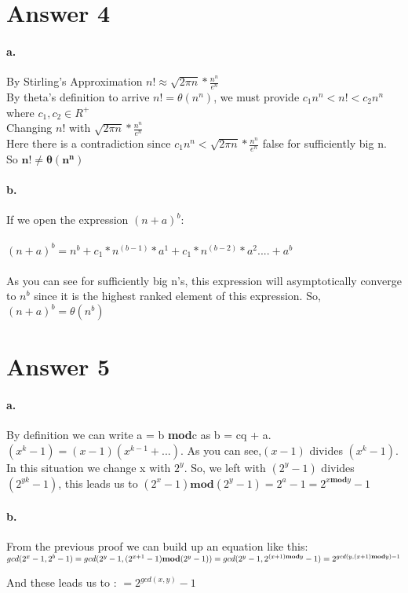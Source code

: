 \documentclass[11pt]{article}
\begin{document}
\newpage
\section*{Answer 4}
\paragraph{a.}
By Stirling's Approximation $n! \approx \sqrt{2\pi n} * \frac{n^n}{e^n}$ \\
By theta's definition to arrive $n! = \theta(n^n)$, we must provide $c_1n^n< n!<c_2n^n $ where $c_1,c_2 \in R^+$ \\
Changing $n!$ with $\sqrt{2\pi n} * \frac{n^n}{e^n}$ \\
Here there is a contradiction since $c_1n^n <\sqrt{2\pi n} * \frac{n^n}{e^n} $ false for sufficiently big n.\\
So $\mathbf{n! \neq \theta(n^n)} $

\paragraph{b.}
If we open the expression $(n+a)^b$:\\\\
$(n + a)^b = n^b + c_1 * n^(b-1)*a^1 + c_1 * n^(b-2)*a^2 .... + a^b$ \\\\
As you can see for sufficiently big n's, this expression will asymptotically converge to $n^b$ since it is the highest ranked element of this expression. So, $(n + a)^b = \theta(n^b)$
\section*{Answer 5}
\paragraph{a.}
By definition we can write a = b \textbf{mod}c as b = cq + a. $(x^k - 1) = (x-1)(x^{k-1} + ...).$ As you can see,$(x-1)$ divides $(x^k -1)$. In this situation we change x with $2^y$. So, we left with $(2^y-1)$ divides $(2^{yk} -1)$, this leads us to $(2^x -1) \mathbf{mod} (2^y -1) = 2^a -1 = 2^{x\mathbf{mod}y} -1$
\paragraph{b.}
From the previous proof we can build up an equation like this:
$
gcd(2^{x} - 1, 2^b - 1) = gcd(2^y - 1, (2^{x+1} -1) \mathbf{mod}(2^y -1))\\
= gcd(2^y -1, 2^{(x+1)\mathbf{mod}y} -1)\\
= 2^{gcd(y,(x+1) \mathbf{mod}y) -1}\\$

And these leads us to :
$= 2^{gcd(x,y)} -1$
\end{document}
